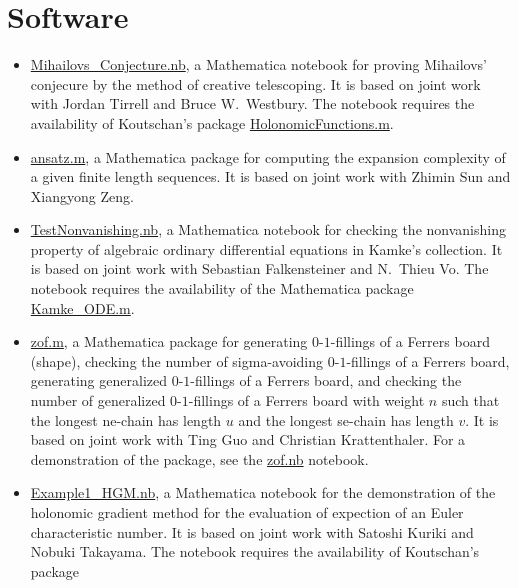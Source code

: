 \documentclass[a4paper,12pt]{article}
\begin{document}
\section*{\Large{Software}}
\begin{itemize}
\item \href{https://yzhang1616.github.io/ct/Mihailovs_Conjecture.nb}{Mihailovs\_Conjecture.nb},  a Mathematica notebook for 
proving Mihailovs' conjecure by the method of creative telescoping. It is based on joint work
with Jordan Tirrell and Bruce W.\ Westbury.   The notebook requires the availability of Koutschan's package 
 \href{http://www.risc.jku.at/research/combinat/software/ergosum/RISC/HolonomicFunctions.html}{HolonomicFunctions.m}.
\item \href{https://yzhang1616.github.io/complexity/ansatz.m}{ansatz.m}, 
a Mathematica package for computing the expansion complexity of a given finite length sequences. 
It is based on joint work with Zhimin Sun and Xiangyong Zeng. 
  \item \href{https://yzhang1616.github.io/TestNonvanishing.nb}{TestNonvanishing.nb}, 
    a Mathematica notebook for checking the nonvanishing property of algebraic ordinary
    differential equations in Kamke's collection. It is based on joint work
    with Sebastian Falkensteiner and N.\ Thieu Vo. 
    The notebook requires the availability of the Mathematica package \href{https://yzhang1616.github.io/Kamke_ODE.m}{Kamke\_ODE.m}.
  \item \href{https://yzhang1616.github.io/zof/zof.m}{zof.m}, a Mathematica package for generating $0$-$1$-fillings 
  of a Ferrers board (shape), checking the number of
    sigma-avoiding $0$-$1$-fillings of a Ferrers board, 
     generating generalized $0$-$1$-fillings of a Ferrers board, 
     and checking the number of generalized $0$-$1$-fillings of a Ferrers board with weight $n$
    such that the longest ne-chain has length $u$ 
    and the longest se-chain has length $v$. It is based on joint work with Ting
    Guo and Christian Krattenthaler. For a demonstration of the package,
    see the \href{https://yzhang1616.github.io/zof/zof.nb}{zof.nb} notebook. 
  \item \href{https://yzhang1616.github.io/ec1/Example1_HGM.nb}{Example1\_HGM.nb}, a Mathematica notebook for
    the demonstration of the holonomic gradient method for the evaluation of
    expection of an Euler characteristic number. It is based on joint work
    with Satoshi Kuriki and Nobuki Takayama. 
    The notebook requires the availability of Koutschan's package 

\end{itemize}
\end{document}
